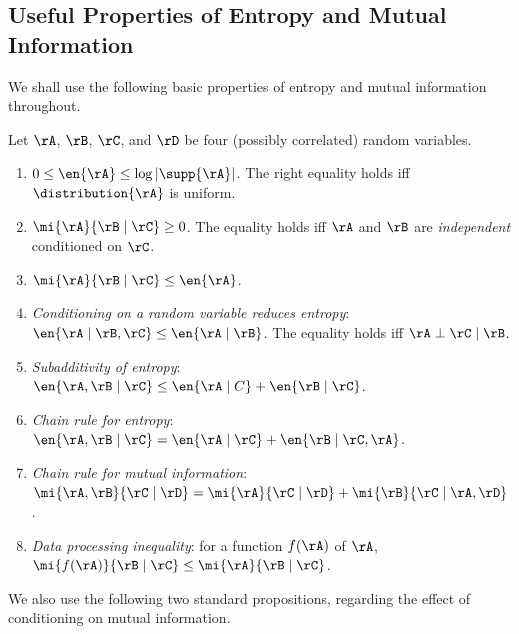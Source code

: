 \subsection{Useful Properties of Entropy and Mutual Information}\label{sec:prop-en-mi}

We shall use the following basic properties of entropy and mutual information throughout. 


\begin{fact}\label{fact:it-facts}
  Let $\rA$, $\rB$, $\rC$, and $\rD$ be four (possibly correlated) random variables.
   \begin{enumerate}
  \item \label{part:uniform} $0 \leq \en{\rA} \leq \log|\supp{\rA}|$. The right equality holds
    iff $\distribution{\rA}$ is uniform.
  \item \label{part:info-zero} $\mi{\rA}{\rB \mid \rC} \geq 0$. The equality holds iff $\rA$ and
    $\rB$ are \emph{independent} conditioned on $\rC$.
    \item \label{part:info-atmost-rv} $\mi{\rA}{\rB \mid \rC} \leq \en{\rA}$.
  \item \label{part:cond-reduce} \emph{Conditioning on a random variable reduces entropy}:
    $\en{\rA \mid \rB,\rC} \leq \en{\rA \mid  \rB}$.  The equality holds iff $\rA \perp \rC \mid \rB$.
    \item \label{part:sub-additivity} \emph{Subadditivity of entropy}: $\en{\rA,\rB \mid \rC}
    \leq \en{\rA \mid C} + \en{\rB \mid  \rC}$.
   \item \label{part:ent-chain-rule} \emph{Chain rule for entropy}: $\en{\rA,\rB \mid \rC} = \en{\rA \mid \rC} + \en{\rB \mid \rC,\rA}$.
  \item \label{part:chain-rule} \emph{Chain rule for mutual information}: $\mi{\rA,\rB}{\rC \mid \rD} = \mi{\rA}{\rC \mid \rD} + \mi{\rB}{\rC \mid  \rA,\rD}$.
  \item \label{part:data-processing} \emph{Data processing inequality}: for a function $f(\rA)$ of $\rA$, $\mi{f(\rA)}{\rB \mid \rC} \leq \mi{\rA}{\rB \mid \rC}$. 
   \end{enumerate}
\end{fact}


\noindent
We also use the following two standard propositions, regarding the effect of conditioning on mutual information.


